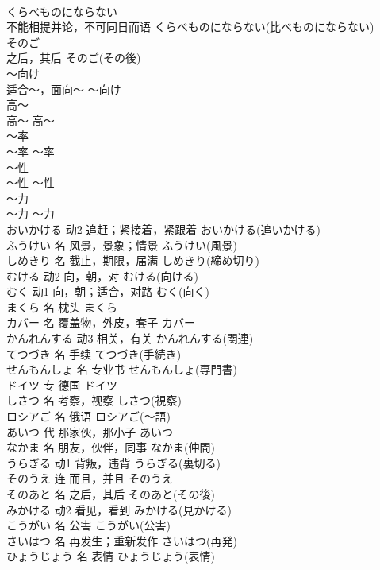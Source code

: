 \documentclass[8pt]{extreport}
\begin{document}
\begin{CJK}{UTF8}{min}
\\	くらべものにならない	
\\	不能相提并论，不可同日而语	くらべものにならない(比べものにならない)	
\\	そのご	
\\	之后，其后	そのご(その後)	
\\	～向け	
\\	适合～，面向～	～向け	
\\	高～	
\\	高～	高～	
\\	～率	
\\	～率	～率	
\\	～性	
\\	～性	～性	
\\	～力	
\\	～力	～力	
\\	おいかける	动2	追赶；紧接着，紧跟着	おいかける(追いかける)	
\\	ふうけい	名	风景，景象；情景	ふうけい(風景)	
\\	しめきり	名	截止，期限，届满	しめきり(締め切り)	
\\	むける	动2	向，朝，对	むける(向ける)	
\\	むく	动1	向，朝；适合，对路	むく(向く)	
\\	まくら	名	枕头	まくら	
\\	カバー	名	覆盖物，外皮，套子	カバー	
\\	かんれんする	动3	相关，有关	かんれんする(関連)	
\\	てつづき	名	手续	てつづき(手続き)	
\\	せんもんしょ	名	专业书	せんもんしょ(専門書)	
\\	ドイツ	专	德国	ドイツ	
\\	しさつ	名	考察，视察	しさつ(視察)	
\\	ロシアご	名	俄语	ロシアご(～語)	
\\	あいつ	代	那家伙，那小子	あいつ	
\\	なかま	名	朋友，伙伴，同事	なかま(仲間)	
\\	うらぎる	动1	背叛，违背	うらぎる(裏切る)	
\\	そのうえ	连	而且，并且	そのうえ	
\\	そのあと	名	之后，其后	そのあと(その後)	
\\	みかける	动2	看见，看到	みかける(見かける)	
\\	こうがい	名	公害	こうがい(公害)	
\\	さいはつ	名	再发生；重新发作	さいはつ(再発)	
\\	ひょうじょう	名	表情	ひょうじょう(表情)	

\end{CJK}
\end{document}
